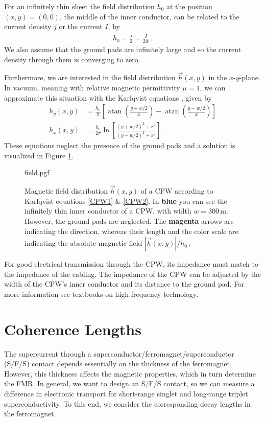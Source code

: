 For an infinitely thin sheet the field distribution $h_0$ at the position $(x,y)=(0,0)$, the middle of the inner conductor, can be related to the current density $j$ or the current $I$, by
\begin{align}
    h_0=\frac{j}{2}=\frac{I}{2w}\,.
\end{align}
We also assume that the ground pads are infinitely large and so the current density through them is converging to zero.

Furthermore, we are interested in the field distribution $\vec{h}(x,y)$ in the $x$-$y$-plane. In vacuum, meaning with relative magnetic permittivity $\mu=1$, we can approximate this situation with the Karlqvist equations \cite{karlqvist1954calculation}, given by
\begin{align}
    h_y(x,y)&=\frac{h_0}{\pi} \left[ \operatorname{atan}\left(\frac{y+w/2}{x}\right) - \operatorname{atan}\left(\frac{y-w/2}{x} \right) \right] \label{CPW1}\\
    h_x(x,y)&=\frac{h_0}{2\pi} \ln \left[ \frac{\left(y+w/2 \right)^2+x^2}{\left(y-w/2 \right)^2+x^2}\right]\,. \label{CPW2}
\end{align}
These equations neglect the presence of the ground pads and a solution is visualized in Figure \ref{fig:CPW_field}.
\begin{figure}
    \centering
    {field.pgf}
    \caption[Magnetic field distribution of a CPW]{Magnetic field distribution $\vec{h}(x,y)$ of a CPW according to Karlqvist equations \ref{CPW1} \& \ref{CPW2}. In \textbf{\color{seeblau100} blue} you can see the infinitely thin inner conductor of a CPW, with width $w=300$\,\textmu m. However, the ground pads are neglected. The \textbf{\color{antiseeblau100} magenta} arrows are indicating the direction, whereas their length and the color scale are indicating the absolute magnetic field $|\vec{h}(x,y)|/h_0$\,.}
    \label{fig:CPW_field}
\end{figure}

For good electrical transmission through the CPW, its impedance must match to the impedance of the cabling. The impedance of the CPW can be adjusted by the width of the CPW's inner conductor and its distance to the ground pad. For more information see textbooks on high frequency technology.  \cite{wadell1991transmission, wiley2001CPW}

\section{Coherence Lengths} \label{sec:coherence_length}
The supercurrent through a superconductor/ferromagnet/superconductor (S/F/S) contact depends essentially on the thickness of the ferromagnet. However, this thickness affects the magnetic properties, which in turn determine the FMR. In general, we want to design an S/F/S contact, so we can measure a difference in electronic transport for short-range singlet and long-range triplet superconductivity. To this end, we consider the corresponding decay lengths in the ferromagnet.

